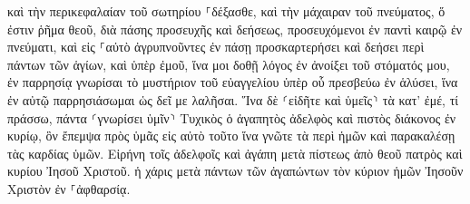 \documentclass{openreader}
\begin{document}
καὶ τὴν περικεφαλαίαν τοῦ σωτηρίου ⸀δέξασθε, καὶ τὴν μάχαιραν τοῦ πνεύματος, ὅ ἐστιν ῥῆμα θεοῦ, 
διὰ πάσης προσευχῆς καὶ δεήσεως, προσευχόμενοι ἐν παντὶ καιρῷ ἐν πνεύματι, καὶ εἰς ⸀αὐτὸ ἀγρυπνοῦντες ἐν πάσῃ προσκαρτερήσει καὶ δεήσει περὶ πάντων τῶν ἁγίων, 
καὶ ὑπὲρ ἐμοῦ, ἵνα μοι δοθῇ λόγος ἐν ἀνοίξει τοῦ στόματός μου, ἐν παρρησίᾳ γνωρίσαι τὸ μυστήριον τοῦ εὐαγγελίου 
ὑπὲρ οὗ πρεσβεύω ἐν ἁλύσει, ἵνα ἐν αὐτῷ παρρησιάσωμαι ὡς δεῖ με λαλῆσαι. 
Ἵνα δὲ ⸂εἰδῆτε καὶ ὑμεῖς⸃ τὰ κατ’ ἐμέ, τί πράσσω, πάντα ⸂γνωρίσει ὑμῖν⸃ Τυχικὸς ὁ ἀγαπητὸς ἀδελφὸς καὶ πιστὸς διάκονος ἐν κυρίῳ, 
ὃν ἔπεμψα πρὸς ὑμᾶς εἰς αὐτὸ τοῦτο ἵνα γνῶτε τὰ περὶ ἡμῶν καὶ παρακαλέσῃ τὰς καρδίας ὑμῶν. 
Εἰρήνη τοῖς ἀδελφοῖς καὶ ἀγάπη μετὰ πίστεως ἀπὸ θεοῦ πατρὸς καὶ κυρίου Ἰησοῦ Χριστοῦ. 
ἡ χάρις μετὰ πάντων τῶν ἀγαπώντων τὸν κύριον ἡμῶν Ἰησοῦν Χριστὸν ἐν ⸀ἀφθαρσίᾳ. 
\end{document}
